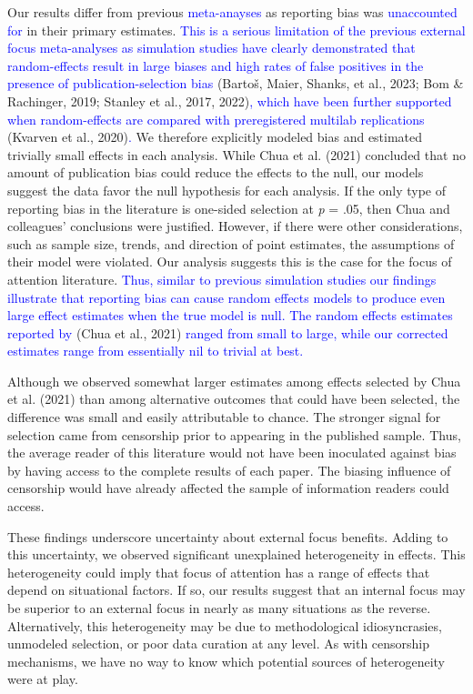 \documentclass[
  man, donotrepeattitle,floatsintext]{apa7}
\begin{document}
Our results differ from previous \textcolor{blue}{meta-anayses} as reporting bias was \textcolor{blue}{unaccounted for} in their primary estimates. \textcolor{blue}{This is a serious limitation of the previous external focus meta-analyses as simulation studies have clearly demonstrated that random-effects result in large biases and high rates of false positives in the presence of publication-selection bias} (Bartoš, Maier, Shanks, et al., 2023; Bom \& Rachinger, 2019; Stanley et al., 2017, 2022)\textcolor{blue}{, which have been further supported when random-effects are compared with preregistered multilab replications} (Kvarven et al., 2020)\textcolor{blue}{.} We therefore explicitly modeled bias and estimated trivially small effects in each analysis. While Chua et al. (2021) concluded that no amount of publication bias could reduce the effects to the null, our models suggest the data favor the null hypothesis for each analysis. If the only type of reporting bias in the literature is one-sided selection at \emph{p} = .05, then Chua and colleagues' conclusions were justified. However, if there were other considerations, such as sample size, trends, and direction of point estimates, the assumptions of their model were violated. Our analysis suggests this is the case for the focus of attention literature. \textcolor{blue}{Thus, similar to previous simulation studies our findings illustrate that reporting bias can cause random effects models to produce even large effect estimates when the true model is null. The random effects estimates reported by} (Chua et al., 2021) \textcolor{blue}{ranged from small to large, while our corrected estimates range from essentially nil to trivial at best.}

Although we observed somewhat larger estimates among effects selected by Chua et al. (2021) than among alternative outcomes that could have been selected, the difference was small and easily attributable to chance. The stronger signal for selection came from censorship prior to appearing in the published sample. Thus, the average reader of this literature would not have been inoculated against bias by having access to the complete results of each paper. The biasing influence of censorship would have already affected the sample of information readers could access.

These findings underscore uncertainty about external focus benefits. Adding to this uncertainty, we observed significant unexplained heterogeneity in effects. This heterogeneity could imply that focus of attention has a range of effects that depend on situational factors. If so, our results suggest that an internal focus may be superior to an external focus in nearly as many situations as the reverse. Alternatively, this heterogeneity may be due to methodological idiosyncrasies, unmodeled selection, or poor data curation at any level. As with censorship mechanisms, we have no way to know which potential sources of heterogeneity were at play.
\end{document}

